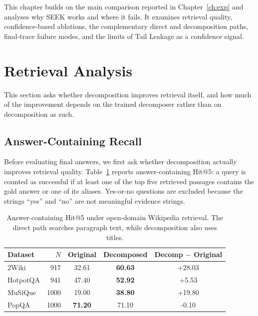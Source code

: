 \documentclass{nthu_thesis}
\begin{document}
\begin{thesiscjk}
This chapter builds on the main comparison reported in Chapter~\ref{ch:exp} and analyses why SEEK works and where it fails. It examines retrieval quality, confidence-based ablations, the complementary direct and decomposition paths, final-trace failure modes, and the limits of Tail Leakage as a confidence signal.

\section{Retrieval Analysis}
\label{sec:retrieval-analysis}

This section asks whether decomposition improves retrieval itself, and how much of the improvement depends on the trained decomposer rather than on decomposition as such.

\subsection{Answer-Containing Recall}
\label{sec:retrieval-recall}

Before evaluating final answers, we first ask whether decomposition actually improves retrieval quality. Table~\ref{tab:answer-recall} reports answer-containing Hit@5: a query is counted as successful if at least one of the top five retrieved passages contains the gold answer or one of its aliases. Yes-or-no questions are excluded because the strings ``yes'' and ``no'' are not meaningful evidence strings.

\begin{table}[h]
    \centering
    \caption[Answer-Containing Retrieval Recall]{Answer-containing Hit@5 under open-domain Wikipedia retrieval. The direct path searches paragraph text, while decomposition also uses titles.}
    \label{tab:answer-recall}
    \setlength{\tabcolsep}{7pt}
    \small
    \begin{tabular}{ l r c c c }
        \toprule
        Dataset & $N$ & Original & Decomposed & Decomp $-$ Original \\
        \midrule
        2Wiki & 917 & 32.61 & \textbf{60.63} & +28.03 \\
        HotpotQA & 941 & 47.40 & \textbf{52.92} & +5.53 \\
        MuSiQue & 1000 & 19.00 & \textbf{38.80} & +19.80 \\
        PopQA & 1000 & \textbf{71.20} & 71.10 & -0.10 \\
        \bottomrule
    \end{tabular}
\end{table}


\end{thesiscjk}
\end{document}
